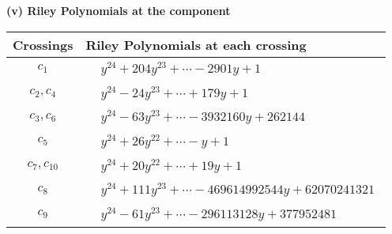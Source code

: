 \documentclass[1p]{elsarticle_modified}
\theoremstyle{definition}
\begin{document}
\newpage\renewcommand{\arraystretch}{1}
\flushleft \textbf{(v) Riley Polynomials at the component}\newline \\
\begin{tabular}{m{50pt}|m{274pt}}
Crossings & \hspace{64pt}Riley Polynomials at each crossing \\
\hline $$\begin{aligned}c_{1}\end{aligned}$$&$\begin{aligned}
&y^{24}+204 y^{23}+\cdots-2901 y+1
\end{aligned}$\\
\hline $$\begin{aligned}c_{2},c_{4}\end{aligned}$$&$\begin{aligned}
&y^{24}-24 y^{23}+\cdots+179 y+1
\end{aligned}$\\
\hline $$\begin{aligned}c_{3},c_{6}\end{aligned}$$&$\begin{aligned}
&y^{24}-63 y^{23}+\cdots-3932160 y+262144
\end{aligned}$\\
\hline $$\begin{aligned}c_{5}\end{aligned}$$&$\begin{aligned}
&y^{24}+26 y^{22}+\cdots- y+1
\end{aligned}$\\
\hline $$\begin{aligned}c_{7},c_{10}\end{aligned}$$&$\begin{aligned}
&y^{24}+20 y^{22}+\cdots+19 y+1
\end{aligned}$\\
\hline $$\begin{aligned}c_{8}\end{aligned}$$&$\begin{aligned}
&y^{24}+111 y^{23}+\cdots-469614992544 y+62070241321
\end{aligned}$\\
\hline $$\begin{aligned}c_{9}\end{aligned}$$&$\begin{aligned}
&y^{24}-61 y^{23}+\cdots-296113128 y+377952481
\end{aligned}$\\

\end{tabular}
\end{document}
